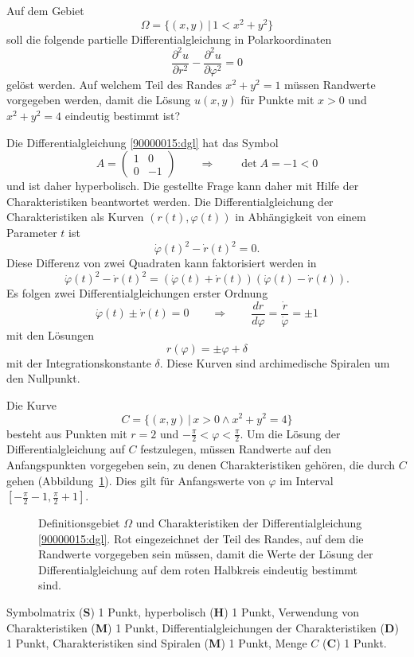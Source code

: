 Auf dem Gebiet
\[
\Omega = \{ (x,y)\,|\, 1 < x^2 + y^2\}
\]
soll die folgende partielle Differentialgleichung in Polarkoordinaten
\begin{equation}
\frac{\partial^2 u}{\partial r^2}
-
\frac{\partial^2 u}{\partial \varphi^2}
=
0
\label{90000015:dgl}
\end{equation}
gelöst werden.
Auf welchem Teil des Randes $x^2 +y^2 = 1$ müssen Randwerte vorgegeben
werden, damit die Lösung $u(x,y)$ für Punkte mit $x>0$ und $x^2 + y^2 = 4$
eindeutig bestimmt ist?

\begin{loesung}
Die Differentialgleichung \eqref{90000015:dgl} hat das Symbol
\[
A
=
\begin{pmatrix}
1&0\\
0&-1
\end{pmatrix}
\qquad\Rightarrow\qquad
\det A=-1<0
\]
und ist daher hyperbolisch.
Die gestellte Frage kann daher mit Hilfe der Charakteristiken beantwortet
werden.
Die Differentialgleichung der Charakteristiken als Kurven $(r(t),\varphi(t))$
in Abhängigkeit von einem Parameter $t$ ist
\[
\dot\varphi(t)^2 - \dot r(t)^2=0.
\]
Diese Differenz von zwei Quadraten kann faktorisiert werden in
\[
\dot\varphi(t)^2 - \dot r(t)^2
=
(\dot\varphi(t) + \dot r(t))
(\dot\varphi(t) - \dot r(t)).
\]
Es folgen zwei Differentialgleichungen erster Ordnung
\[
\dot\varphi(t)\pm\dot r(t) = 0
\qquad\Rightarrow\qquad
\frac{dr}{d\varphi}
=
\frac{\dot r}{\dot \varphi}
=
\pm 1
\]
mit den Lösungen
\[
r(\varphi) =  \pm \varphi + \delta
\]
mit der Integrationskonstante $\delta$.
Diese Kurven sind archimedische Spiralen um den Nullpunkt.

Die Kurve 
\[
C
=
\{ (x,y)\,|\, x>0\wedge x^2 +y^2=4\}
\]
besteht aus Punkten mit $r=2$ und $-\frac{\pi}{2}<\varphi<\frac{\pi}2$.
Um die Lösung der Differentialgleichung auf $C$ festzulegen, müssen
Randwerte auf den Anfangspunkten vorgegeben sein, zu denen Charakteristiken
gehören, die durch $C$ gehen (Abbildung~\ref{90000015:fig}).
Dies gilt für Anfangswerte von $\varphi$ im Interval
$[-\frac{\pi}2-1,\frac{\pi}2+1]$.
\begin{figure}
\centering
{}
\caption{Definitionsgebiet $\Omega$ und Charakteristiken der
Differentialgleichung \eqref{90000015:dgl}.
Rot eingezeichnet der Teil des Randes, auf dem die Randwerte vorgegeben
sein müssen, damit die Werte der Lösung der Differentialgleichung auf dem
roten Halbkreis eindeutig bestimmt sind.
\label{90000015:fig}}
\end{figure}
\end{loesung}

\begin{bewertung}
Symbolmatrix ({\bf S}) 1 Punkt,
hyperbolisch ({\bf H}) 1 Punkt,
Verwendung von Charakteristiken ({\bf M}) 1 Punkt,
Differentialgleichungen der Charakteristiken ({\bf D}) 1 Punkt,
Charakteristiken sind Spiralen ({\bf M}) 1 Punkt,
Menge $C$ ({\bf C}) 1 Punkt.
\end{bewertung}

